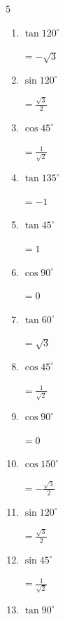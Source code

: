 \begin{multicols}{5}
\begin{enumerate}
        $\displaystyle =\frac{\sqrt{3}}{2}$

  \item $\displaystyle \tan{120^\circ}$

        $\displaystyle =-\sqrt{3}$

  \item $\displaystyle \sin{120^\circ}$

        $\displaystyle =\frac{\sqrt{3}}{2}$

  \item $\displaystyle \cos{45^\circ}$

        $\displaystyle =\frac{1}{\sqrt{2}}$

  \item $\displaystyle \tan{135^\circ}$

        $\displaystyle =-1$

  \item $\displaystyle \tan{45^\circ}$

        $\displaystyle =1$

  \item $\displaystyle \cos{90^\circ}$

        $\displaystyle =0$

  \item $\displaystyle \tan{60^\circ}$

        $\displaystyle =\sqrt{3}$

  \item $\displaystyle \cos{45^\circ}$

        $\displaystyle =\frac{1}{\sqrt{2}}$

  \item $\displaystyle \cos{90^\circ}$

        $\displaystyle =0$

\columnbreak %

\resetques

  \item $\displaystyle \cos{150^\circ}$

        $\displaystyle =-\frac{\sqrt{3}}{2}$

  \item $\displaystyle \sin{120^\circ}$

        $\displaystyle =\frac{\sqrt{3}}{2}$

  \item $\displaystyle \sin{45^\circ}$

        $\displaystyle =\frac{1}{\sqrt{2}}$

  \item $\displaystyle \tan{90^\circ}$


\end{enumerate}
\end{multicols}
